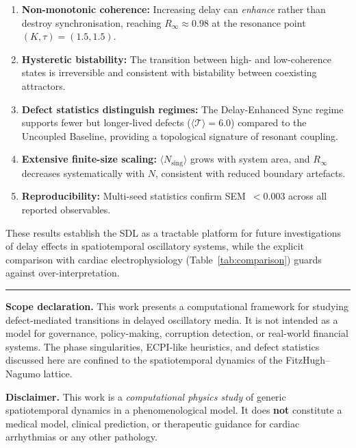 \documentclass[11pt,a4paper]{article}
\begin{document}
\begin{enumerate}
    \item \textbf{Non-monotonic coherence:} Increasing delay
          can \emph{enhance} rather than destroy synchronisation,
          reaching $R_\infty \approx 0.98$ at the resonance
          point $(K, \tau) = (1.5, 1.5)$.

    \item \textbf{Hysteretic bistability:} The transition
          between high- and low-coherence states is irreversible
          and consistent with bistability between coexisting
          attractors.

    \item \textbf{Defect statistics distinguish regimes:}
          The Delay-Enhanced Sync regime supports fewer but
          longer-lived defects ($\langle\mathcal{T}\rangle = 6.0$)
          compared to the Uncoupled Baseline, providing a
          topological signature of resonant coupling.

    \item \textbf{Extensive finite-size scaling:}
          $\langle N_{\text{sing}}\rangle$ grows with system
          area, and $R_\infty$ decreases systematically with $N$,
          consistent with reduced boundary artefacts.

    \item \textbf{Reproducibility:} Multi-seed statistics
          confirm SEM~$< 0.003$ across all reported observables.
\end{enumerate}

These results establish the SDL as a tractable platform for
future investigations of delay effects in spatiotemporal
oscillatory systems, while the explicit comparison with cardiac
electrophysiology (Table~\ref{tab:comparison}) guards against
over-interpretation.

\vspace{1em}
\noindent\rule{\textwidth}{0.4pt}


\vspace{0.5em}
\noindent\textbf{Scope declaration.}
This work presents a computational framework for studying defect-mediated
transitions in delayed oscillatory media. It is not intended as a model for
governance, policy-making, corruption detection, or real-world financial
systems. The phase singularities, ECPI-like heuristics, and defect statistics
discussed here are confined to the spatiotemporal dynamics of the
FitzHugh--Nagumo lattice.

\noindent\textbf{Disclaimer.} This work is a
\textit{computational physics study} of generic spatiotemporal
dynamics in a phenomenological model. It does \textbf{not}
constitute a medical model, clinical prediction, or therapeutic
guidance for cardiac arrhythmias or any other pathology.
\end{document}
